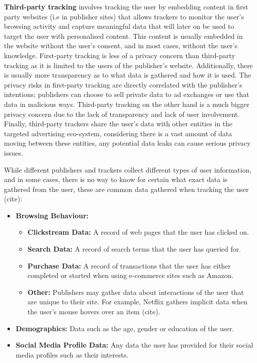 \documentclass{l4proj}
\begin{document}
\textbf{Third-party tracking} involves tracking the user by embedding content in first party websites (i.e in publisher sites) that allows trackers to monitor the user's browsing activity and capture meaningful data that will later on be used to target the user with personalised content. This content is usually embedded in the website without the user's consent, and in most cases, without the user's knowledge.
First-party tracking is less of a privacy concern than third-party tracking as it is limited to the users of the publisher's website. Additionally, there is usually more transparency as to what data is gathered and how it is used. The privacy risks in first-party tracking are directly correlated with the publisher's intentions; publishers can choose to sell private data to ad exchanges or use that data in malicious ways. Third-party tracking on the other hand is a much bigger privacy concern due to the lack of transparency and lack of user involvement. Finally, third-party trackers share the user's data with other entities in the targeted advertising eco-system, considering there is a vast amount of data moving between these entities, any potential data leaks can cause serious privacy issues. 

While different publishers and trackers collect different types of user information, and in some cases, there is no way to know for certain what exact data is gathered from the user, these are common data gathered when tracking the user (cite):
\begin{itemize}
   \item 
   \textbf{Browsing Behaviour:}
   \begin{itemize}
	\item
           \textbf{Clickstream Data:} A record of web pages that the user has clicked on.
	\item
           \textbf{Search Data:} A record of search terms that the user has queried for.
	\item
           \textbf{Purchase Data:} A record of transactions that the user has either completed or started when using e-commerce sites such as Amazon.
	\item
           \textbf{Other:} Publishers may gather data about interactions of the user that are unique to their site. For example, Netflix gathers implicit data when the user's mouse hovers over an item (cite).
   \end{itemize}
   \item
   \textbf{Demographics:} Data such as the age, gender or education of the user.
   \item
   \textbf{Social Media Profile Data:} Any data the user has provided for their social media profiles such as their interests. 
\end{itemize}
\end{document}
